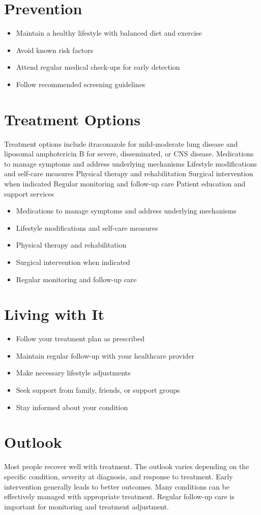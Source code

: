 \section{Prevention}
\begin{itemize}[noitemsep]
  \item Maintain a healthy lifestyle with balanced diet and exercise
  \item Avoid known risk factors
  \item Attend regular medical check-ups for early detection
  \item Follow recommended screening guidelines
\end{itemize}
\section{Treatment Options}
Treatment options include itraconazole for mild-moderate lung disease and liposomal amphotericin B for severe, disseminated, or CNS disease. Medications to manage symptoms and address underlying mechanisms Lifestyle modifications and self-care measures Physical therapy and rehabilitation Surgical intervention when indicated Regular monitoring and follow-up care Patient education and support services

\begin{itemize}[noitemsep]
  \item Medications to manage symptoms and address underlying mechanisms
  \item Lifestyle modifications and self-care measures
  \item Physical therapy and rehabilitation
  \item Surgical intervention when indicated
  \item Regular monitoring and follow-up care
\end{itemize}
\section{Living with It}
\begin{itemize}[noitemsep]
  \item Follow your treatment plan as prescribed
  \item Maintain regular follow-up with your healthcare provider
  \item Make necessary lifestyle adjustments
  \item Seek support from family, friends, or support groups
  \item Stay informed about your condition
\end{itemize}
\section{Outlook}
Most people recover well with treatment. The outlook varies depending on the specific condition, severity at diagnosis, and response to treatment. Early intervention generally leads to better outcomes. Many conditions can be effectively managed with appropriate treatment. Regular follow-up care is important for monitoring and treatment adjustment.
